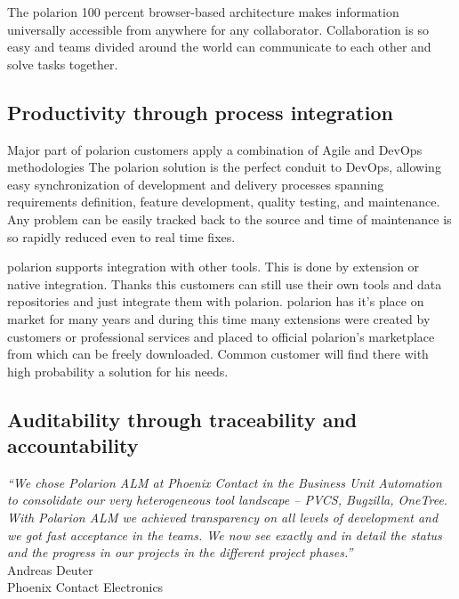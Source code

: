 \documentclass[thesis=M,english]{FITthesis}[2012/06/26]
\begin{document}
The \acrshort{polarion} 100 percent browser-based architecture makes information universally accessible from anywhere for any collaborator. Collaboration is so easy and teams divided around the world can communicate to each other and solve tasks together.\\

\subsection{Productivity through process integration}

Major part of \acrshort{polarion} customers apply a combination of Agile and DevOps methodologies The \acrshort{polarion} solution is the perfect conduit to DevOps, allowing easy synchronization of development and delivery processes spanning requirements definition, feature development, quality testing, and maintenance. Any problem can be easily tracked back to the source and time of maintenance is so rapidly reduced even to real time fixes.

\acrshort{polarion} supports integration with other tools. This is done by extension or native integration. Thanks this customers can still use their own tools and data repositories and just integrate them with \acrshort{polarion}. \acrshort{polarion} has it's place on market for many years and during this time many extensions were created by customers or professional services and placed to official \acrshort{polarion}'s marketplace from which can be freely downloaded. Common customer will find there with high probability a solution for his needs.  

\subsection{Auditability through traceability and accountability}

\begin{center}
	\textit{“We chose Polarion ALM at Phoenix Contact
		in the Business Unit Automation to consolidate
		our very heterogeneous tool
		landscape – PVCS, Bugzilla, OneTree. With
		Polarion ALM we achieved transparency on
		all levels of development and we got fast
		acceptance in the teams. We now see exactly
		and in detail the status and the progress in
		our projects in the different project phases.”}\\
	Andreas Deuter\\
	Phoenix Contact Electronics\\
\end{center}
\end{document}
